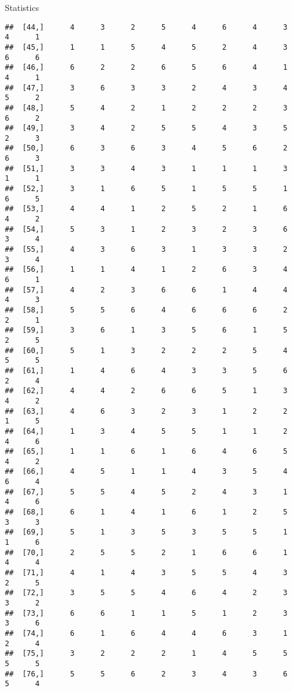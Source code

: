 \documentclass[
  ignorenonframetext,
]{beamer}
\begin{document}
\begin{frame}[fragile]{Statistics}
\begin{verbatim}
##  [44,]      4      3      2      5      4      6      4      3      4      1
##  [45,]      1      1      5      4      5      2      4      3      6      6
##  [46,]      6      2      2      6      5      6      4      1      4      1
##  [47,]      3      6      3      3      2      4      3      4      5      2
##  [48,]      5      4      2      1      2      2      2      3      6      2
##  [49,]      3      4      2      5      5      4      3      5      2      3
##  [50,]      6      3      6      3      4      5      6      2      6      3
##  [51,]      3      3      4      3      1      1      1      3      1      1
##  [52,]      3      1      6      5      1      5      5      1      6      5
##  [53,]      4      4      1      2      5      2      1      6      4      2
##  [54,]      5      3      1      2      3      2      3      6      3      4
##  [55,]      4      3      6      3      1      3      3      2      3      4
##  [56,]      1      1      4      1      2      6      3      4      6      1
##  [57,]      4      2      3      6      6      1      4      4      4      3
##  [58,]      5      5      6      4      6      6      6      2      2      1
##  [59,]      3      6      1      3      5      6      1      5      2      5
##  [60,]      5      1      3      2      2      2      5      4      5      5
##  [61,]      1      4      6      4      3      3      5      6      2      4
##  [62,]      4      4      2      6      6      5      1      3      4      2
##  [63,]      4      6      3      2      3      1      2      2      1      5
##  [64,]      1      3      4      5      5      1      1      2      4      6
##  [65,]      1      1      6      1      6      4      6      5      4      2
##  [66,]      4      5      1      1      4      3      5      4      6      4
##  [67,]      5      5      4      5      2      4      3      1      4      6
##  [68,]      6      1      4      1      6      1      2      5      3      3
##  [69,]      5      1      3      5      3      5      5      1      1      6
##  [70,]      2      5      5      2      1      6      6      1      4      4
##  [71,]      4      1      4      3      5      5      4      3      2      5
##  [72,]      3      5      5      4      6      4      2      3      3      2
##  [73,]      6      6      1      1      5      1      2      3      3      6
##  [74,]      6      1      6      4      4      6      3      1      2      4
##  [75,]      3      2      2      2      1      4      5      5      5      5
##  [76,]      5      5      6      2      3      4      3      6      5      4

\end{verbatim}
\end{frame}
\end{document}

